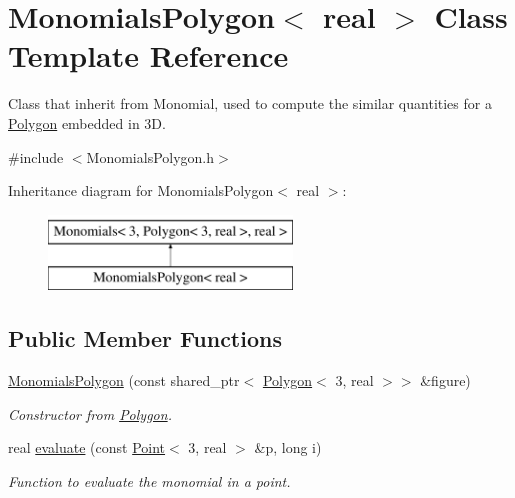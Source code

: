 \hypertarget{class_monomials_polygon}{\section{\-Monomials\-Polygon$<$ real $>$ \-Class \-Template \-Reference}
\label{class_monomials_polygon}
}


\-Class that inherit from \-Monomial, used to compute the similar quantities for a \hyperlink{class_polygon}{\-Polygon} embedded in 3\-D.  




{\ttfamily \#include $<$\-Monomials\-Polygon.\-h$>$}

\-Inheritance diagram for \-Monomials\-Polygon$<$ real $>$\-:\begin{figure}[H]
\begin{center}
\leavevmode
\includegraphics[height=2.000000cm]{class_monomials_polygon}
\end{center}
\end{figure}
\subsection*{\-Public \-Member \-Functions}
\begin{DoxyCompactItemize}
\item 
\hypertarget{class_monomials_polygon_a15ff4c26d8e8948a3233a2cf31cfaccd}{\hyperlink{class_monomials_polygon_a15ff4c26d8e8948a3233a2cf31cfaccd}{\-Monomials\-Polygon} (const shared\-\_\-ptr$<$ \hyperlink{class_polygon}{\-Polygon}$<$ 3, real $>$$>$ \&figure)}\label{class_monomials_polygon_a15ff4c26d8e8948a3233a2cf31cfaccd}

\begin{DoxyCompactList}\small\item\em \-Constructor from \hyperlink{class_polygon}{\-Polygon}. \end{DoxyCompactList}\item 
real \hyperlink{class_monomials_polygon_a789109ea081ae68f3d2219fc115e7de7}{evaluate} (const \hyperlink{class_point}{\-Point}$<$ 3, real $>$ \&p, long i)
\begin{DoxyCompactList}\small\item\em \-Function to evaluate the monomial in a point. \end{DoxyCompactList}\end{DoxyCompactItemize}
